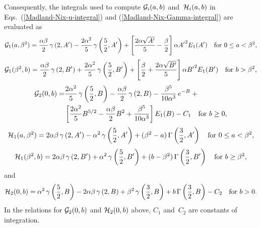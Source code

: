 Consequently, the integrals used to compute ${\cal G}_i( a, b )$
and~${\cal H}_i( a, b )$ in Eqs.~(\ref{Madland-Nix-u-integral}) 
and (\ref{Madland-Nix-Gamma-integral}) are evaluated as
\begin{equation}
  {\cal G}_1( a, \beta^2 ) = 
    \frac{\alpha \beta}{2} \, \gamma \left( 2, A' \right)
       -\frac{2 \alpha^2}{5} \, \gamma \left( \frac{5}{2}, A' \right) +
       \left[
          \frac{2 \alpha \sqrt{A'}}{5} - \frac{\beta}{2}
        \right] \alpha {A'}^2 E_1( A' )
       \quad \text{for $0 \le a < \beta^2$},
\label{Madland-Nix-G1a}
\end{equation}
\begin{equation}
  {\cal G}_1( \beta^2, b ) = 
    \frac{\alpha \beta}{2} \, \gamma \left( 2, B' \right)
       + \frac{2 \alpha^2}{5} \, \gamma \left( \frac{5}{2}, B' \right) +
       \left[
          \frac{\beta}{2} + \frac{2 \alpha \sqrt{B'}}{5}
        \right] \alpha {B'}^2 E_1( B' )
       \quad \text{for $b > \beta^2$},
 \label{Madland-Nix-G1b}
\end{equation}
\begin{equation}
 \begin{split}
  {\cal G}_2( 0, b )  = &
    \frac{2 \alpha^2}{5} \, \gamma \left( \frac{5}{2}, B \right) -
    \frac{\alpha \beta}{2} \, \gamma \left( 2, B \right) -
    \frac{\beta^5}{10 \alpha^3} \,e^{-B} + {}\\
      & \left[
        \frac{2 \alpha^2}{5} B^{5/2} - \frac{\alpha \beta}{2} {B}^2 +
          \frac{ \beta^5}{10 \alpha^3} \right]  E_1( B) - C_1
       \quad \text{for $b \ge 0$},
 \end{split}
\label{Madland-Nix-G2}
\end{equation}
\begin{equation}
  {\cal H}_1(a, \beta^2) = 2 \alpha \beta \, \gamma \left( 2, A' \right) -
  \alpha^2 \, \gamma \left( \frac{5}{2}, A' \right) +
     (\beta^2 - a) \, \Gamma\left( \frac{3}{2}, A' \right)
     \quad \text{for $0 \le a < \beta^2$},
\label{Madland-Nix-H1a}
\end{equation}
\begin{equation}
  {\cal H}_1(\beta^2, b) = 2 \alpha \beta \, \gamma \left( 2, B' \right) +
     \alpha^2 \, \gamma \left( \frac{5}{2}, B' \right) +
     (b - \beta^2) \, \Gamma\left( \frac{3}{2}, B' \right)
     \quad \text{for $b \ge \beta^2$},
\label{Madland-Nix-H1b}
\end{equation}
and
\begin{equation}
   {\cal H}_2(0, b) = \alpha^2 \, \gamma \left( \frac{5}{2}, B \right) -
     2 \alpha\beta \, \gamma \left( 2, B \right) +
     \beta^2 \, \gamma \left( \frac{3}{2}, B \right) +
     b \, \Gamma \left( \frac{3}{2}, B \right) - C_2
     \quad \text{for $b > 0$}.
\label{Madland-Nix-H2}
\end{equation}
In the relations for ${\cal G}_2(0, b)$ and ${\cal H}_2(0, b)$ above, $C_1$
and~$C_2$ are constants of integration.

